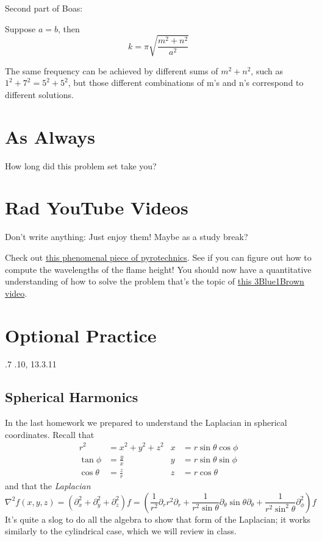 \documentclass[answers]{exam}\newcommand{\repositoryInformationSetup}{     \usepackage[dvipsnames]{xcolor}     \usepackage[ angle=90, color=black, opacity=1, scale=2, ]{background}      \SetBgPosition{current page.west}      \SetBgVshift{-4.5mm}      \backgroundsetup{contents={{\color{green}\texttt{-{}-} differs from commit \texttt{f3526e2} in 0 files}}} } \newcommand{\commit}{{{\color{green}f3526e2}}}\usepackage{amsmath}
\newcommand{\oneover}[1]{\ensuremath{\frac{1}{#1}}}                             \newcommand{\inverse}{\ensuremath{^{-1}}}                                       \providecommand{\half}{\ensuremath{\frac{1}{2}} }                               \renewcommand{\half}{\ensuremath{\frac{1}{2}} }                                 \newcommand{\quarter}{\ensuremath{\frac{1}{4}} }
\newcommand{\grad}{\ensuremath{\nabla}\xspace}
\begin{document}
\begin{questions}
\begin{solution}
		Second part of Boas:
		
		Suppose $a=b$, then $$ k = \pi \sqrt{\frac{m^2+n^2}{a^2}}$$

		The same frequency can be achieved by different sums of $m^2+n^2$, such as $1^2 + 7^2 = 5^2 + 5^2$, but those different combinations of m's and n's correspond to different solutions.

	\end{solution}


	\clearpage
	\section*{As Always}
	\question How long did this problem set take you?

	\section*{Rad YouTube Videos}
	Don't write anything: Just enjoy them!  Maybe as a study break?

	\question Check out \href{https://www.youtube.com/watch?v=dihQuwrf9yQ}{this phenomenal piece of pyrotechnics}. See if you can figure out how to compute the wavelengths of the flame height!
	\question You should now have a quantitative understanding of how to solve the problem that's the topic of \href{https://www.youtube.com/watch?v=ToIXSwZ1pJU}{this 3Blue1Brown video}.

	\section*{Optional Practice}

	.7
	.10, 13.3.11
	\subsection*{Spherical Harmonics}
	\question In the last homework we prepared to understand the Laplacian in spherical coordinates.
	Recall that
	\begin{align*}
		r^2         & = x^2 + y^2 + z^2 & x & = r \sin\theta \cos\phi
		\\
		\tan \phi   & = \frac{y}{x}     & y & = r \sin\theta \sin\phi
		\\
		\cos \theta & = \frac{z}{r}     & z & = r \cos\theta
	\end{align*}
	and that the \emph{Laplacian}
	\begin{equation}
		\grad^2 f(x,y,z) = \left(\partial_x^2 + \partial_y^2 + \partial_z^2\right )f = \left(\oneover{r^2} \partial_r r^2 \partial_r + \oneover{r^2\sin\theta} \partial_\theta \sin\theta \partial_\theta + \oneover{r^2\sin^2\theta} \partial^2_\phi\right) f
	\end{equation}
	It's quite a slog to do all the algebra to show that form of the Laplacian; it works similarly to the cylindrical case, which we will review in class.


\end{questions}
\end{document}
